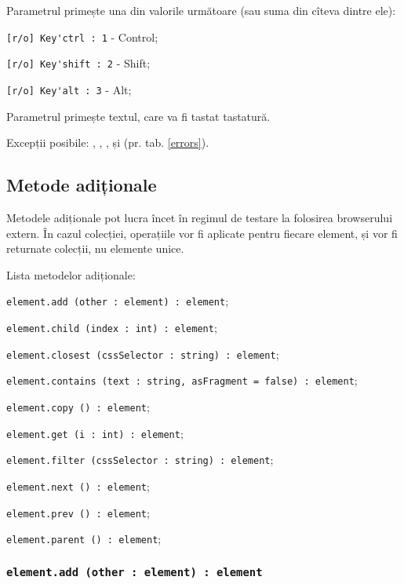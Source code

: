 Parametrul  primește una din valorile următoare (sau suma din cîteva dintre ele):
\begin{icItems}
	\item \lstinline|[r/o] Key'ctrl : 1| - Control;
	\item \lstinline|[r/o] Key'shift : 2| - Shift;
	\item \lstinline|[r/o] Key'alt : 3| - Alt;
\end{icItems}

Parametrul  primește textul, care va fi tastat tastatură.

Excepții posibile: , , ,   și  (pr. tab. \ref{errors}).

\subsection{Metode adiționale}

Metodele adiționale pot lucra încet în regimul de testare la folosirea browserului extern. În cazul colecției, operațiile vor fi aplicate pentru fiecare element, și vor fi returnate colecții, nu elemente unice. 

Lista metodelor adiționale:
\begin{icItems}
	\item \lstinline|element.add (other : element) : element|;
	\item \lstinline|element.child (index : int) : element|;
	\item \lstinline|element.closest (cssSelector : string) : element|;
	\item \lstinline|element.contains (text : string, asFragment = false) : element|;
	\item \lstinline|element.copy () : element|;
	\item \lstinline|element.get (i : int) : element|;
	\item \lstinline|element.filter (cssSelector : string) : element|;
	\item \lstinline|element.next () : element|;
	\item \lstinline|element.prev () : element|;
	\item \lstinline|element.parent () : element|;
\end{icItems}

\subsubsection{\lstinline|element.add (other : element) : element|}


